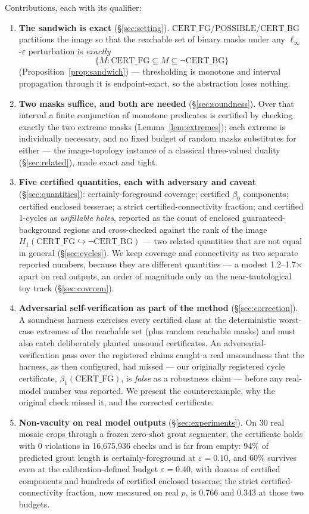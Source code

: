 \documentclass[10pt]{article}
\newcommand{\CFG}{\mathrm{CERT\_FG}}
\newcommand{\CBG}{\mathrm{CERT\_BG}}
\newcommand{\POSS}{\mathrm{POSSIBLE}}
\newcommand{\eps}{\varepsilon}
\begin{document}
Contributions, each with its qualifier:
\begin{enumerate}
\item \textbf{The sandwich is exact} (\S\ref{sec:setting}).
  $\CFG$/\allowbreak$\POSS$/\allowbreak$\CBG$ partitions the image so
  that the reachable set of binary masks under any
  $\ell_\infty$-$\eps$ perturbation is \emph{exactly}
  \[
    \{M : \CFG \subseteq M \subseteq \lnot\CBG\}
  \]
  (Proposition~\ref{prop:sandwich}) --- thresholding is monotone and
  interval propagation through it is endpoint-exact, so the abstraction
  loses nothing.

\item \textbf{Two masks suffice, and both are needed}
  (\S\ref{sec:soundness}). Over that interval a
  finite conjunction of monotone predicates is certified by checking
  exactly the two extreme masks (Lemma~\ref{lem:extremes}); each extreme
  is individually necessary, and no fixed budget of random masks
  substitutes for either --- the image-topology instance of a classical
  three-valued duality (\S\ref{sec:related}), made exact and tight.
\item \textbf{Five certified quantities, each with adversary and caveat}
  (\S\ref{sec:quantities}): certainly-foreground coverage; certified
  $\beta_0$ components; certified enclosed tesserae; a strict
  certified-connectivity fraction; and certified 1-cycles as
  \emph{unfillable holes}, reported as the count of enclosed
  guaranteed-background regions and cross-checked against the rank of the
  image $H_1(\CFG\hookrightarrow\lnot\CBG)$ --- two related quantities that
  are not equal in general (\S\ref{sec:cycles}). We
  keep coverage and connectivity as two separate reported numbers, because
  they are different quantities --- a modest 1.2--1.7$\times$ apart on real
  outputs, an order of magnitude only on the near-tautological toy track
  (\S\ref{sec:covconn}).
\item \textbf{Adversarial self-verification as part of the method}
  (\S\ref{sec:correction}). A soundness harness exercises every certified
  class at the deterministic worst-case extremes of the reachable set
  (plus random reachable masks) and must also catch deliberately planted
  unsound certificates. An adversarial-verification
  pass over the registered claims caught a real unsoundness that the
  harness, as then configured, had missed --- our originally registered
  cycle certificate, $\beta_1(\CFG)$, is \emph{false} as a robustness
  claim --- before any real-model number was reported. We present the
  counterexample, why the original check missed it, and the corrected
  certificate.
\item \textbf{Non-vacuity on real model outputs} (\S\ref{sec:experiments}).
  On 30 real mosaic crops through a frozen zero-shot grout segmenter, the
  certificate holds with 0 violations in 16{,}675{,}936 checks and is far
  from empty: 94\% of predicted grout length is certainly-foreground at
  $\eps=0.10$, and 60\% survives even at the calibration-defined budget
  $\eps=0.40$, with dozens of certified components and hundreds of
  certified enclosed tesserae; the strict certified-connectivity fraction,
  now measured on real $p$, is 0.766 and 0.343 at those two budgets.
\end{enumerate}
\end{document}
